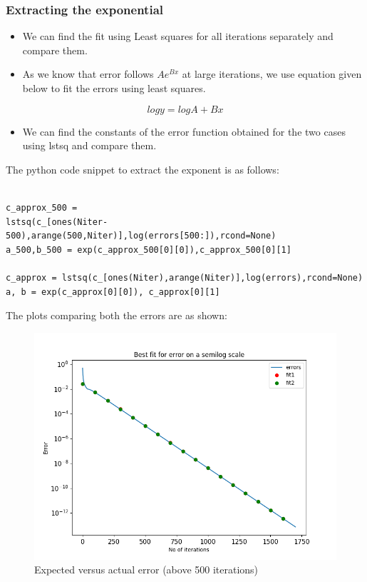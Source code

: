 \documentclass[11pt, a4paper]{article}
\begin{document}
\subsubsection*{Extracting the exponential}

\begin{itemize}
\item
  We can find the fit using Least squares for all iterations
  separately and compare them.
\item
  As we know that error follows \(Ae^{Bx}\) at large iterations, we use
  equation given below to fit the errors using least squares.
\end{itemize}

\begin{equation}
    logy = logA + Bx
\end{equation}

\begin{itemize}
\item
  We can find the constants of the error function obtained for the two cases
  using lstsq and compare them.
\end{itemize}

The python code snippet to extract the exponent is as follows:

   \begin{verbatim}
   
c_approx_500 = 
lstsq(c_[ones(Niter-500),arange(500,Niter)],log(errors[500:]),rcond=None)  
a_500,b_500 = exp(c_approx_500[0][0]),c_approx_500[0][1]

c_approx = lstsq(c_[ones(Niter),arange(Niter)],log(errors),rcond=None)
a, b = exp(c_approx[0][0]), c_approx[0][1] 
\end{verbatim}
\newpage
The plots comparing both the errors are as shown:

\begin{figure}[!tbh]
 \centering
 \includegraphics[scale=0.7]{Figure5.png}  
 \caption{Expected versus actual error (above 500 iterations)}
\end{figure}
\end{document}
